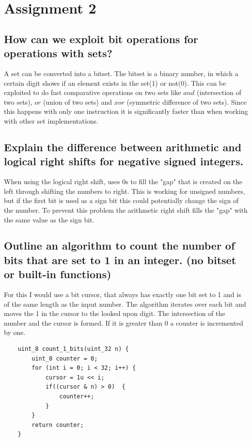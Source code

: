 \documentclass[runningheads]{llncs}
\begin{document}
\section*{Assignment 2}

\subsection*{How can we exploit bit operations for operations with sets?}

A set can be converted into a bitset. The bitset is a binary number, in which a certain digit shows if an element exists
in the set(1) or not(0). This can be exploited to do fast comparative operations on two sets like $and$ (intersection
of two sets), $or$ (union of two sets) and $xor$ (symmetric difference of two sets). Since this happens with only one
instruction it is significantly faster than when working with other set implementations.

\subsection*{Explain the difference between arithmetic and logical right shifts for negative signed integers.}
When using the logical right shift, uses 0s to fill the "gap" that is created on the left through shifting the
numbers to right. This is working for unsigned numbers, but if the first bit is used as a sign bit this could
potentially change the sign of the number. To prevent this problem the arithmetic right shift fills the "gap"
with the same value as the sign bit.

\subsection*{Outline an algorithm to count the number of bits that are set to 1 in an integer. (no bitset or built-in functions)}
For this I would use a bit cursor, that always has exactly one bit set to 1 and is of the same length as the input
number. The algorithm iterates over each bit and moves the 1 in the cursor to the looked upon digit. The intersection of
the number and the cursor is formed. If it is greater than 0 a counter is incremented by one.

\begin{verbatim}
    uint_8 count_1_bits(uint_32 n) {
        uint_8 counter = 0;
        for (int i = 0; i < 32; i++) {
            cursor = 1u << i;
            if((cursor & n) > 0)  {
                counter++;
            }
        }
        return counter;
    }
\end{verbatim}
\end{document}
